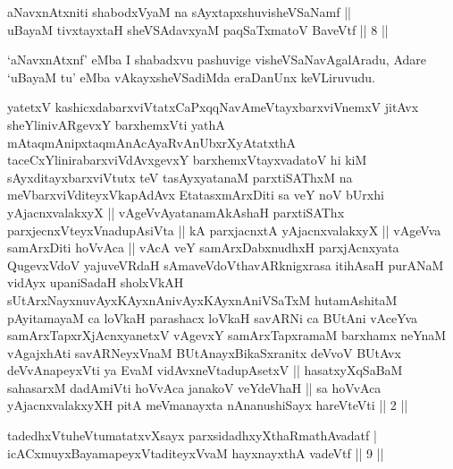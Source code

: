 
\begin{shl}
aNavxnAtxniti shabodxV\s yaM na sAyxtapxshuvisheVSaNamf || \\
uBayaM tivxtayxtaH sheVSAdavxyaM paqSaTxmatoV BaveVtf \hfill ||  8 ||  
\end{shl}

\begin{artha}
`aNavxnAtxnf' eMba I shabadxvu pashuvige visheVSaNavAgalAradu, Adare `uBayaM tu' eMba vAkayxsheVSadiMda eraDanUnx keVLiruvudu.
\end{artha}


\begin{kandikeshl}
yatetxV kashicxdabarxviVtatxCaPxqqNavAmeVtayxbarxviVnemxV jitAvx sheYlinivARgevxY barxhemxVti yathA mAtaqmAnipxtaqmAnAcAyaRvAnUbxrXyAtatxthA taceCxYlinirabarxviVdAvxgevxY barxhemxVtayxvadatoV hi kiM sAyxditayxbarxviVtutx teV tasAyxyatanaM parxtiSAThxM na meV\s barxviVditeyxVkapAdAvx EtatasxmArxDiti sa veY noV bUrxhi yAjacnxvalakxyX || vAgeVvAyatanamAkAshaH parxtiSAThx parxjecnxVteyxVnadupAsiVta || kA parxjacnxtA yAjacnxvalakxyX || vAgeVva samArxDiti hoVvAca || vAcA veY samArxDabxnudhxH parxjAcnxyata QugevxVdoV yajuveVRdaH sAmaveVdoV\s thavARknigxrasa itihAsaH purANaM vidAyx upaniSadaH sholxVkAH sUtArxNayxnuvAyxKAyxnAni\break vAyxKAyxnAniVSaTxM hutamAshitaM pAyitamayaM ca loVkaH parashacx loVkaH savARNi ca BUtAni vAceYva samArxTapxrXjAcnxyanetxV vAgevxY samArxTapxramaM barxhamx neYnaM vAgajxhAti savARNeyxVnaM BUtAnayxBikaSxranitx deVvoV BUtAvx deVvAnapeyxVti ya EvaM vidAvxneVtadupAsetxV || hasatxyXqSaBaM sahasarxM dadAmiVti hoVvAca janakoV veYdeVhaH || sa hoVvAca yAjacnxvalakxyXH pitA meV\s manayxta nAnanushiSayx hareVteVti || 2 ||
\end{kandikeshl}




\begin{shl}
tadedhxVtuheVtumatatxvXsayx parxsidadhxyXthaRmathAvadatf |\\
icACxmuyxBayamapeyxVtaditeyxVvaM hayxnayxthA vadeVtf \hfill || 9 || 
\end{shl}
\vskip 2cm


